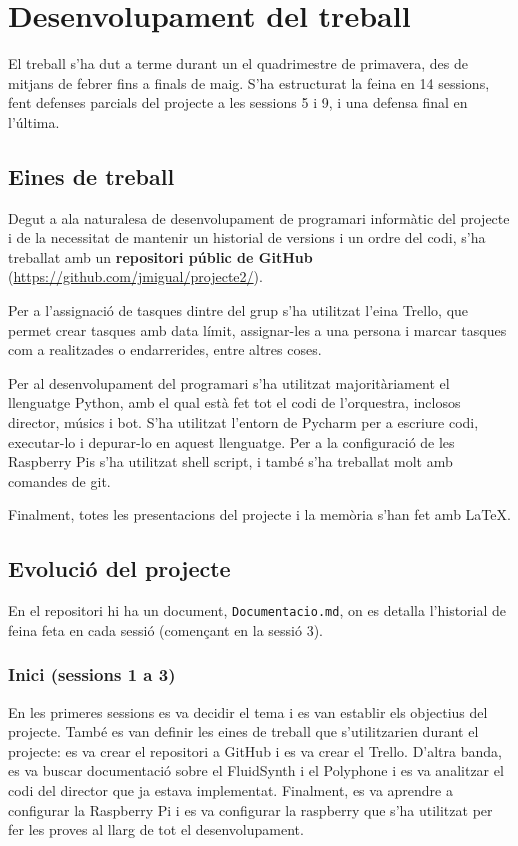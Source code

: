 \documentclass[a4paper]{paper}
\let\oldsection\section
\renewcommand\section{\clearpage\oldsection}
\begin{document}
\section{Desenvolupament del treball}
El treball s'ha dut a terme durant un el quadrimestre de primavera, des de mitjans de febrer fins a finals de maig. S'ha estructurat la feina en 14 sessions, fent defenses parcials del projecte a les sessions 5 i 9, i una defensa final en l'última.

\subsection{Eines de treball}
Degut a ala naturalesa de desenvolupament de programari informàtic del projecte i de la necessitat de mantenir un historial de versions i un ordre del codi, s'ha treballat amb un \textbf{repositori públic de GitHub} (\url{https://github.com/jmigual/projecte2/}).

Per a l'assignació de tasques dintre del grup s'ha utilitzat l'eina Trello\cite{trello}, que permet crear tasques amb data límit, assignar-les a una persona i marcar tasques com a realitzades o endarrerides, entre altres coses.

Per al desenvolupament del programari s'ha utilitzat majoritàriament el llenguatge Python\cite{python}, amb el qual està fet tot el codi de l'orquestra, inclosos director, músics i bot. S'ha utilitzat l'entorn de Pycharm\cite{pycharm} per a escriure codi, executar-lo i depurar-lo en aquest llenguatge. Per a la configuració de les Raspberry Pis s'ha utilitzat shell script, i també s'ha treballat molt amb comandes de git.

Finalment, totes les presentacions del projecte i la memòria s'han fet amb \LaTeX.

\subsection{Evolució del projecte}
En el repositori hi ha un document, \texttt{Documentacio.md}, on es detalla l'historial de feina feta en cada sessió (començant en la sessió 3).

\subsubsection{Inici (sessions 1 a 3)}
En les primeres sessions es va decidir el tema i es van establir els objectius del projecte. També es van definir les eines de treball que s'utilitzarien durant el projecte: es va crear el repositori a GitHub i es va crear el Trello. D'altra banda, es va buscar documentació sobre el FluidSynth i el Polyphone i es va analitzar el codi del director que ja estava implementat. Finalment, es va aprendre a configurar la Raspberry Pi i es va configurar la raspberry que s'ha utilitzat per fer les proves al llarg de tot el desenvolupament.
\end{document}

